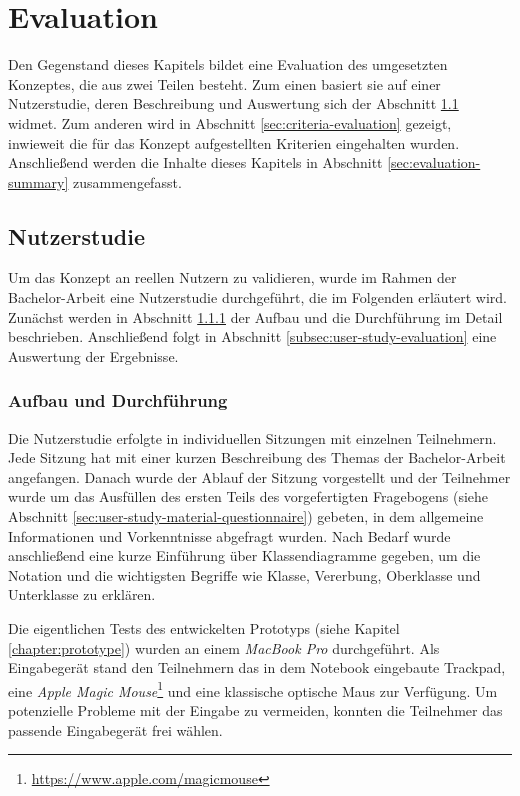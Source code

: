 
\chapter{Evaluation}
\label{chapter:evaluation}

Den Gegenstand dieses Kapitels bildet eine Evaluation des umgesetzten Konzeptes, die aus zwei Teilen besteht. Zum einen basiert sie auf einer Nutzerstudie, deren Beschreibung und Auswertung sich der Abschnitt \ref{sec:user-study} widmet. Zum anderen wird in Abschnitt \ref{sec:criteria-evaluation} gezeigt, inwieweit die für das Konzept aufgestellten Kriterien eingehalten wurden. Anschließend werden die Inhalte dieses Kapitels in Abschnitt \ref{sec:evaluation-summary} zusammengefasst.

\section{Nutzerstudie}
\label{sec:user-study}

Um das Konzept an reellen Nutzern zu validieren, wurde im Rahmen der Bachelor-Arbeit eine Nutzerstudie durchgeführt, die im Folgenden erläutert wird. Zunächst werden in Abschnitt \ref{subsec:user-study-setup} der Aufbau und die Durchführung im Detail beschrieben. Anschließend folgt in Abschnitt \ref{subsec:user-study-evaluation} eine Auswertung der Ergebnisse.

\subsection{Aufbau und Durchführung}
\label{subsec:user-study-setup}

Die Nutzerstudie erfolgte in individuellen Sitzungen mit einzelnen Teilnehmern. Jede Sitzung hat mit einer kurzen Beschreibung des Themas der Bachelor-Arbeit angefangen. Danach wurde der Ablauf der Sitzung vorgestellt und der Teilnehmer wurde um das Ausfüllen des ersten Teils des vorgefertigten Fragebogens (siehe Abschnitt \ref{sec:user-study-material-questionnaire}) gebeten, in dem allgemeine Informationen und Vorkenntnisse abgefragt wurden. Nach Bedarf wurde anschließend eine kurze Einführung über Klassendiagramme gegeben, um die Notation und die wichtigsten Begriffe wie Klasse, Vererbung, Oberklasse und Unterklasse zu erklären.

Die eigentlichen Tests des entwickelten Prototyps (siehe Kapitel \ref{chapter:prototype}) wurden an einem \textit{MacBook Pro} durchgeführt. Als Eingabegerät stand den Teilnehmern das in dem Notebook eingebaute Trackpad, eine \textit{Apple Magic Mouse}\footnote{\url{https://www.apple.com/magicmouse}} und eine klassische optische Maus zur Verfügung. Um potenzielle Probleme mit der Eingabe zu vermeiden, konnten die Teilnehmer das passende Eingabegerät frei wählen.

